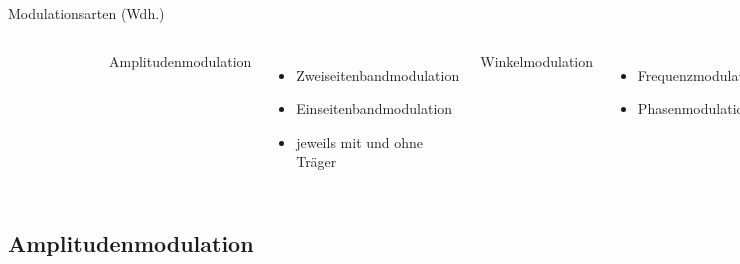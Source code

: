 \begin{frame}{Modulationsarten (Wdh.)}
  \begin{columns}[c]
    \begin{figure}
      \includegraphics[width=\textwidth,height=.80\textheight,keepaspectratio]{e14/modulationen.jpg}\\
    \end{figure}
    Amplitudenmodulation
    \begin{itemize}
      \item Zweiseitenbandmodulation
      \item Einseitenbandmodulation
      \item jeweils mit und ohne Träger
    \end{itemize}
    Winkelmodulation
    \begin{itemize}
      \item Frequenzmodulation
      \item Phasenmodulation
    \end{itemize}
  \end{columns}
\end{frame}

\subsection[AM]{Amplitudenmodulation}

